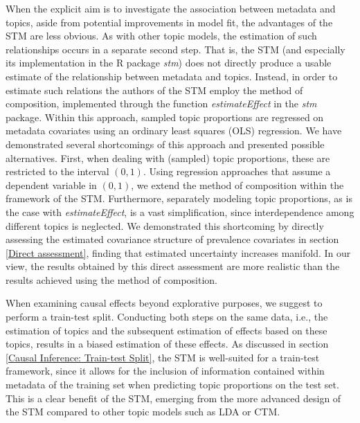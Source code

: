 When the explicit aim is to investigate the association between metadata and topics, aside from potential improvements in model fit, the advantages of the STM are less obvious. As with other topic models, the estimation of such relationships occurs in a separate second step. That is, the STM (and especially its implementation in the R package \textit{stm}) does not directly produce a usable estimate of the relationship between metadata and topics. Instead, in order to estimate such relations the authors of the STM employ the method of composition, implemented through the function \textit{estimateEffect} in the \textit{stm} package. Within this approach, sampled topic proportions are regressed on metadata covariates using an ordinary least squares (OLS) regression. We have demonstrated several shortcomings of this approach and presented possible alternatives. First, when dealing with (sampled) topic proportions, these are restricted to the interval $(0,1)$. Using regression approaches that assume a dependent variable in $(0,1)$, we extend the method of composition within the framework of the STM. Furthermore, separately modeling topic proportions, as is the case with \textit{estimateEffect}, is a vast simplification, since interdependence among different topics is neglected. We demonstrated this shortcoming by directly assessing the estimated covariance structure of prevalence covariates in section \ref{Direct assessment}, finding that estimated uncertainty increases manifold. In our view, the results obtained by this direct assessment are more realistic than the results achieved using the method of composition. 

When examining causal effects beyond explorative purposes, we suggest to perform a train-test split. Conducting both steps on the same data, i.e., the estimation of topics and the subsequent estimation of effects based on these topics, results in a biased estimation of these effects. As discussed in section \ref{Causal Inference: Train-test Split}, the STM is well-suited for a train-test framework, since it allows for the inclusion of information contained within metadata of the training set when predicting topic proportions on the test set. This is a clear benefit of the STM, emerging from the more advanced design of the STM compared to other topic models such as LDA or CTM.

